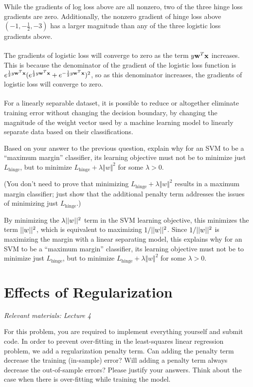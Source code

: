 While the gradients of log loss above are all nonzero, two of the three hinge loss gradients are zero. Additionally, the nonzero gradient of hinge loss above $(-1, -\frac{1}{2}, -3)$ has a larger magnitude than any of the three logistic loss gradients above.\\
\\
The gradients of logistic loss will converge to zero as the term $y \mathbf{w} ^T \mathbf{x}$ increases. This is because the denominator of the gradient of the logistic loss function is $e^{\frac{1}{2} y \mathbf{w} ^T \mathbf{x}}(e^{\frac{1}{2} y \mathbf{w} ^T \mathbf{x}} + e^{-\frac{1}{2} y \mathbf{w} ^T \mathbf{x}})^2$, so as this denominator increases, the gradients of logistic loss will converge to zero.\\
\\
For a linearly separable dataset, it is possible to reduce or altogether eliminate training error without changing the decision boundary, by changing the magnitude of the weight vector used by a machine learning model to linearly separate data based on their classifications.

\problem[5]
Based on your answer to the previous question, explain why for an SVM to be a ``maximum margin'' classifier, its learning objective must not be to minimize just $L_\text{hinge}$, but to minimize $L_\text{hinge} + \lambda\Vert w \Vert^2$ for some $\lambda > 0$.

(You don't need to prove that minimizing $L_\text{hinge} + \lambda\Vert w \Vert^2$ results in a maximum margin classifier; just show that the additional penalty term addresses the issues of minimizing just $L_\text{hinge}$.)

By minimizing the $\lambda \vert \vert w \vert \vert^2$ term in the SVM learning objective, this minimizes the term $\vert \vert w \vert \vert^2$, which is equivalent to maximizing $1/\vert \vert w \vert \vert^2$. Since $1/\vert \vert w \vert \vert^2$ is maximizing the margin with a linear separating model, this explains why for an SVM to be a ``maximum margin'' classifier, its learning objective must not be to minimize just $L_\text{hinge}$, but to minimize $L_\text{hinge} + \lambda\Vert w \Vert^2$ for some $\lambda > 0$.

\newpage
\section{Effects of Regularization}
\textit{Relevant materials: Lecture  4}

For this problem, you are required to implement everything yourself and submit code.
\indent\problem[4] %
In order to prevent over-fitting in the least-squares linear regression problem, we add a regularization penalty term.
Can adding the penalty term decrease the training (in-sample) error?
Will adding a penalty term always decrease the out-of-sample errors?
Please justify your answers. Think about the case when there is over-fitting while training the model.

